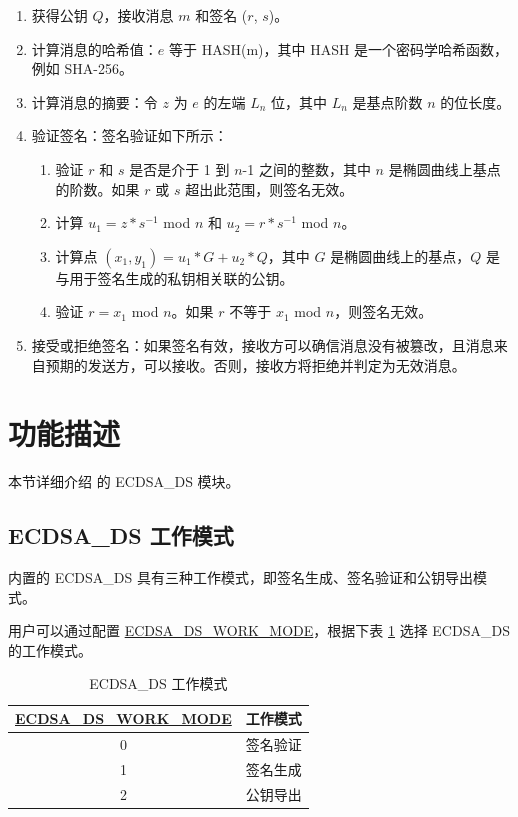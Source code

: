 \documentclass[main\_\_CN.tex]{subfiles}
\begin{document}
\begin{enumerate}
    \item 获得公钥 $Q$，接收消息 $m$ 和签名 ($r$, $s$)。
    \item 计算消息的哈希值：$e$ 等于 HASH(m)，其中 HASH 是一个密码学哈希函数，例如 SHA-256。
    \item 计算消息的摘要：令 $z$ 为 $e$ 的左端 $L_n$ 位，其中 $L_n$ 是基点阶数 $n$ 的位长度。
    \item 验证签名：签名验证如下所示：
        \begin{enumerate}
            \item 验证 $r$ 和 $s$ 是否是介于 1 到 $n$-1 之间的整数，其中 $n$ 是椭圆曲线上基点的阶数。如果 $r$ 或 $s$ 超出此范围，则签名无效。
            \item 计算 $u_1 = z * s^{-1}$ \textrm{mod} $n$ 和 $u_2 = r * s^{-1}$ \textrm{mod} $n$。
            \item 计算点 $(x_1, y_1) = u_1 * G + u_2 * Q$，其中 $G$ 是椭圆曲线上的基点，$Q$ 是与用于签名生成的私钥相关联的公钥。
            \item 验证 $r = x_1$ \textrm{mod} $n$。如果 $r$ 不等于 $x_1$ \textrm{mod} $n$，则签名无效。
        \end{enumerate}
    \item 接受或拒绝签名：如果签名有效，接收方可以确信消息没有被篡改，且消息来自预期的发送方，可以接收。否则，接收方将拒绝并判定为无效消息。
\end{enumerate}

\section{功能描述}

本节详细介绍 \chipname{} 的 ECDSA\_DS 模块。

\subsection{ECDSA\_DS 工作模式}

\chipname{} 内置的 ECDSA\_DS 具有三种工作模式，即签名生成、签名验证和公钥导出模式。

用户可以通过配置 \hyperref[fielddesc:ECDSADSWORKMODE]{ECDSA\_DS\_WORK\_MODE}，根据下表 \ref{tab:ecdsa-working-mode} 选择 ECDSA\_DS 的工作模式。

\begin{table}[H]
    \centering
    \caption{ECDSA\_DS 工作模式}
    \label{tab:ecdsa-working-mode}
    \begin{tabular}{ | c | l | }
    \hline
        \rowcolor{lightgray}
        \textbf{\hyperref[fielddesc:ECDSADSWORKMODE]{ECDSA\_DS\_WORK\_MODE}}      & \textbf{工作模式}\\\hline
        0                       & 签名验证  \\\hline
        1                       & 签名生成     \\\hline
        2                       & 公钥导出         \\\hline
    \end{tabular}
\end{table}
\end{document}
